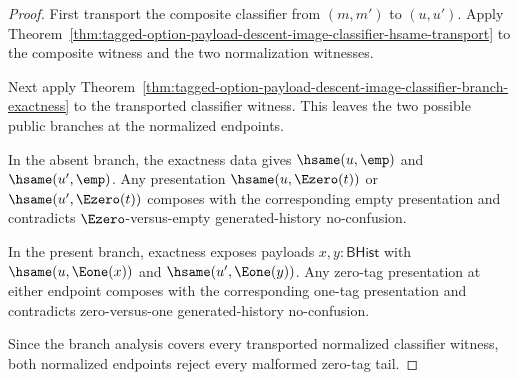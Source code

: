 \begin{proof}
First transport the composite classifier from $(m,m')$ to $(u,u')$. Apply
Theorem~\ref{thm:tagged-option-payload-descent-image-classifier-hsame-transport}
to the composite witness and the two normalization witnesses.

Next apply
Theorem~\ref{thm:tagged-option-payload-descent-image-classifier-branch-exactness}
to the transported classifier witness. This leaves the two possible public
branches at the normalized endpoints.

In the absent branch, the exactness data gives $\hsame(u,\emp)$ and
$\hsame(u',\emp)$. Any presentation $\hsame(u,\Ezero(t))$ or
$\hsame(u',\Ezero(t))$ composes with the corresponding empty presentation and
contradicts $\Ezero$-versus-empty generated-history no-confusion.

In the present branch, exactness exposes payloads $x,y:\mathsf{BHist}$ with
$\hsame(u,\Eone(x))$ and $\hsame(u',\Eone(y))$. Any zero-tag presentation at
either endpoint composes with the corresponding one-tag presentation and
contradicts zero-versus-one generated-history no-confusion.

Since the branch analysis covers every transported normalized classifier
witness, both normalized endpoints reject every malformed zero-tag tail.
\end{proof}

